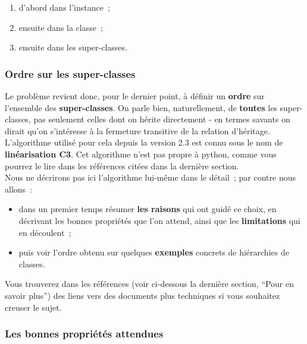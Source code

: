\begin{enumerate}
\def\labelenumi{\arabic{enumi}.}
\tightlist
\item
  d'abord dans l'instance~;
\item
  ensuite dans la classe~;
\item
  ensuite dans les super-classes.
\end{enumerate}

    \hypertarget{ordre-sur-les-super-classes}{%
\subsubsection{Ordre sur les
super-classes}\label{ordre-sur-les-super-classes}}

    Le problème revient donc, pour le dernier point, à définir un
\textbf{ordre} sur l'ensemble des \textbf{super-classes}. On parle bien,
naturellement, de \textbf{toutes} les super-classes, pas seulement
celles dont on hérite directement - en termes savants on dirait qu'on
s'intéresse à la fermeture transitive de la relation d'héritage.\\

L'algorithme utilisé pour cela depuis la version 2.3 est connu sous le
nom de \textbf{linéarisation C3}. Cet algorithme n'est pas propre à
python, comme vous pourrez le lire dans les références citées dans la
dernière section.\\

Nous ne décrirons pas ici l'algorithme lui-même dans le détail~; par
contre nous allons~:

\begin{itemize}
\tightlist
\item
  dans un premier temps résumer \textbf{les raisons} qui ont guidé ce
  choix, en décrivant les bonnes propriétés que l'on attend, ainsi que
  les \textbf{limitations} qui en découlent~;
\item
  puis voir l'ordre obtenu sur quelques \textbf{exemples} concrets de
  hiérarchies de classes.
\end{itemize}

Vous trouverez dans les références (voir ci-dessous la dernière section,
``Pour en savoir plus'') des liens vers des documents plus techniques si
vous souhaitez creuser le sujet.

    \hypertarget{les-bonnes-propriuxe9tuxe9s-attendues}{%
\subsubsection{Les bonnes propriétés
attendues}\label{les-bonnes-propriuxe9tuxe9s-attendues}}

